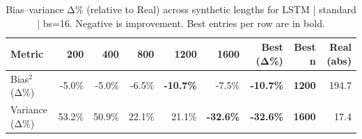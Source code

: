 \renewcommand{\arraystretch}{1.2}
\begin{table}[!t]
\centering
\footnotesize
\caption{Bias–variance Δ\% (relative to Real) across synthetic lengths for LSTM | standard | bs=16. Negative is improvement. Best entries per row are in bold.}
\label{tab:bvdelta_LSTM_standard_bs16}
\setlength{\tabcolsep}{5pt}
\begin{tabular}{lrrrrrrrr}
\toprule
Metric & 200 & 400 & 800 & 1200 & 1600 & Best (Δ\%) & Best n & Real (abs) \\
\midrule
Bias$^2$ (Δ\%) & -5.0\% & -5.0\% & -6.5\% & \textbf{-10.7\%} & -7.5\% & \textbf{-10.7\%} & \textbf{1200} & 194.7 \\
Variance (Δ\%) & 53.2\% & 50.9\% & 22.1\% & 21.1\% & \textbf{-32.6\%} & \textbf{-32.6\%} & \textbf{1600} & 17.4 \\
\bottomrule
\end{tabular}

\end{table}

